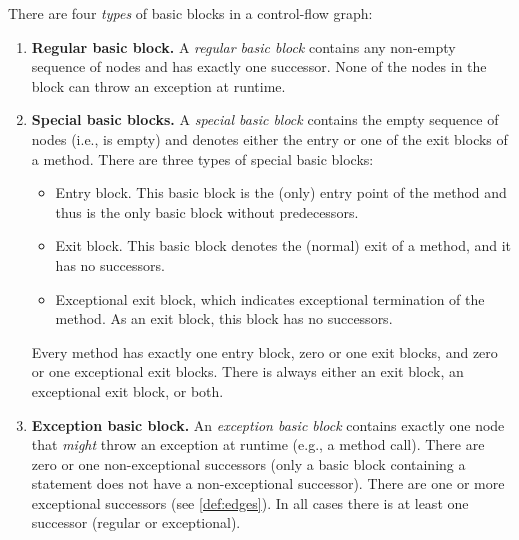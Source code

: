 \begin{definition}
    There are four \emph{types} of basic blocks in a control-flow graph:
    \begin{enumerate}
        \item \textbf{Regular basic block.} A \emph{regular basic
          block} contains any non-empty sequence of nodes and has
          exactly one successor.  None of the nodes in the block can
          throw an exception at runtime.

        \item \textbf{Special basic blocks.} A \emph{special basic
          block} contains the empty sequence of nodes (i.e., is empty)
          and denotes either the entry or one of the exit blocks of a
          method. There are three types of special basic blocks:
        \begin{itemize}
            \item Entry block. This basic block is the (only) entry
              point of the method and thus is the only basic block
              without predecessors.
            \item Exit block. This basic block denotes the (normal)
              exit of a method, and it has no successors.
            \item Exceptional exit block, which indicates exceptional
              termination of the method. As an exit block, this block
              has no successors.
        \end{itemize}
        Every method has exactly one entry block, zero or one exit blocks,
        and zero or one exceptional exit blocks. There is always
        either an exit block, an exceptional exit block, or both.

        \item \textbf{Exception basic block.} An \emph{exception basic
          block} contains exactly one node that \emph{might} throw an
          exception at runtime (e.g., a method call).  There are zero
          or one non-exceptional successors (only a basic block containing a
           statement does not have a non-exceptional
          successor).  There are one or more
          exceptional successors (see \autoref{def:edges}). In all
          cases there is at least one successor (regular or
          exceptional).


\end{enumerate}
\end{definition}
